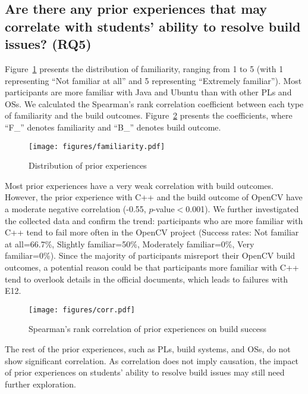 \documentclass[10pt, conference]{IEEEtran}
\begin{document}
\subsection{Are there any prior experiences that may correlate with students’ ability to resolve build issues? (RQ5)}
\label{sec:RQ5}



Figure~\ref{fig:farmiliarity} presents the distribution of familiarity, ranging from 1 to 5 (with 1 representing ``Not familiar at all'' and 5 representing ``Extremely familiar'').
Most participants are more familiar with Java and Ubuntu than with other PLs and OSs. We calculated the Spearman’s rank correlation coefficient between each type of familiarity and the build outcomes.
Figure~\ref{fig:corr} presents the coefficients, where ``F\_'' denotes familiarity and ``B\_'' denotes build outcome.

\begin{figure}[bp]
\vspace{-.4cm}
\centerline{
\texttt{[image: figures/familiarity.pdf]}
}
\vspace{-.4cm}
\caption{Distribution of prior experiences}
\label{fig:farmiliarity}
\end{figure}

Most prior experiences have a very weak correlation with build outcomes. However, the prior experience with C++ and the build outcome of OpenCV have a moderate negative correlation (-0.55, $p$-value$<$0.001). We further investigated the collected data and confirm the trend: participants who are more familiar with C++ tend to fail more often in the OpenCV project (Success rates: Not familiar at all=66.7\%, Slightly familiar=50\%, Moderately familiar=0\%, Very familiar=0\%).
Since the majority of participants misreport their OpenCV build outcomes, a potential reason could be that participants more familiar with C++ tend to overlook details in the official documents, which leads to failures with E12.

\begin{figure}[tbp]
\centerline{
\texttt{[image: figures/corr.pdf]}
}
\vspace{-.4cm}
\caption{Spearman’s rank correlation of prior experiences on build success}
\label{fig:corr}
\vspace{-.4cm}
\end{figure}

The rest of the prior experiences, such as PLs, build systems, and OSs, do not show significant correlation. As correlation does not imply causation, the impact of prior experiences on students’ ability to resolve build issues may still need further exploration.
\end{document}
